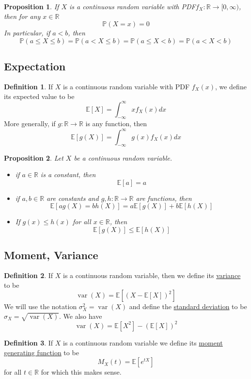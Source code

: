 \documentclass[
]{article}
\newtheorem{proposition}{Proposition}[section]
\theoremstyle{definition}
\newtheorem{definition}{Definition}[section]
\theoremstyle{definition}
\theoremstyle{definition}
\theoremstyle{remark}
\newcommand{\prob}[1]{\mathbb{P}\left(#1\right)}
\newcommand{\fxx}{f_X(x)}
\newcommand{\mx}[1]{M_X(#1)}
\newcommand{\R}{\mathbb{R}}
\newcommand{\E}[1]{\mathbb{E}[#1]}
\newcommand{\varx}{\operatorname{var}(X)}
\begin{document}
\begin{proposition}
  If $X$ is a continuous random variable with PDF\newline $f_X:\R\to[0,\infty)$, then for any $x\in\R$
  \[\prob{X=x}=0\]
  In particular, if $a<b$, then
  \[\prob{a\leq X \leq b}=\prob{a< X \leq b}=\prob{a\leq X < b}=\prob{a< X < b}\]
\end{proposition}

\subsection{Expectation}

\begin{definition}
  If $X$ is a continuous random variable with PDF $\fxx$, we define its expected value to be
  \[\E{X}=\int_{-\infty}^\infty x\fxx dx\]
  More generally, if $g:\R\to\R$ is any function, then
  \[\E{g(X)}=\int_{-\infty}^\infty g(x)\fxx dx\]
\end{definition}

\begin{proposition}
  Let $X$ be a continuous random variable.
  \begin{itemize}
    \item if $a\in\R$ is a constant, then
          \[\E{a}=a\]
    \item if $a,b\in\R$ are constants and $g,h:\R\to\R$ are functions, then
          \[\E{ag(X)=bh(X)}=a\E{g(X)}+b\E{h(X)}\]
    \item If $g(x)\leq h(x)$ for all $x\in\R$, then
          \[\E{g(X)}\leq\E{h(X)}\]
  \end{itemize}
\end{proposition}

\subsection{Moment, Variance}

\begin{definition}
  If $X$ is a continuous random variable, then we define its \underline{variance} to be
  \[\varx=\E{(X-\E{X})^2}\]
  We will use the notation $\sigma^2_X=\varx$ and define the \underline{standard deviation} to be $\sigma_X=\sqrt{\varx}$. We also have
  \[\varx=\E{X^2}-(\E{X})^2\]
\end{definition}

\begin{definition}
  If $X$ is a continuous random variable we define its \underline{moment generating function} to be
  \[\mx{t}=\E{e^{tX}}\]
  for all $t\in\R$ for which this makes sense.
\end{definition}
\end{document}
